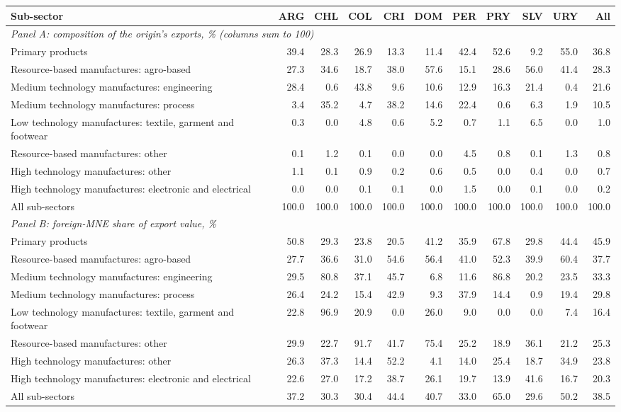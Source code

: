 \begin{tabular}{lrrrrrrrrrr}
\toprule
Sub-sector & ARG & CHL & COL & CRI & DOM & PER & PRY & SLV & URY & All \\
\midrule
\multicolumn{11}{l}{\textit{Panel A: composition of the origin's exports, \% (columns sum to 100)}} \\
Primary products & 39.4 & 28.3 & 26.9 & 13.3 & 11.4 & 42.4 & 52.6 & 9.2 & 55.0 & 36.8 \\
Resource-based manufactures: agro-based & 27.3 & 34.6 & 18.7 & 38.0 & 57.6 & 15.1 & 28.6 & 56.0 & 41.4 & 28.3 \\
Medium technology manufactures: engineering & 28.4 & 0.6 & 43.8 & 9.6 & 10.6 & 12.9 & 16.3 & 21.4 & 0.4 & 21.6 \\
Medium technology manufactures: process & 3.4 & 35.2 & 4.7 & 38.2 & 14.6 & 22.4 & 0.6 & 6.3 & 1.9 & 10.5 \\
Low technology manufactures: textile, garment and footwear & 0.3 & 0.0 & 4.8 & 0.6 & 5.2 & 0.7 & 1.1 & 6.5 & 0.0 & 1.0 \\
Resource-based manufactures: other & 0.1 & 1.2 & 0.1 & 0.0 & 0.0 & 4.5 & 0.8 & 0.1 & 1.3 & 0.8 \\
High technology manufactures: other & 1.1 & 0.1 & 0.9 & 0.2 & 0.6 & 0.5 & 0.0 & 0.4 & 0.0 & 0.7 \\
High technology manufactures: electronic and electrical & 0.0 & 0.0 & 0.1 & 0.1 & 0.0 & 1.5 & 0.0 & 0.1 & 0.0 & 0.2 \\
All sub-sectors & 100.0 & 100.0 & 100.0 & 100.0 & 100.0 & 100.0 & 100.0 & 100.0 & 100.0 & 100.0 \\
\midrule
\multicolumn{11}{l}{\textit{Panel B: foreign-MNE share of export value, \%}} \\
Primary products & 50.8 & 29.3 & 23.8 & 20.5 & 41.2 & 35.9 & 67.8 & 29.8 & 44.4 & 45.9 \\
Resource-based manufactures: agro-based & 27.7 & 36.6 & 31.0 & 54.6 & 56.4 & 41.0 & 52.3 & 39.9 & 60.4 & 37.7 \\
Medium technology manufactures: engineering & 29.5 & 80.8 & 37.1 & 45.7 & 6.8 & 11.6 & 86.8 & 20.2 & 23.5 & 33.3 \\
Medium technology manufactures: process & 26.4 & 24.2 & 15.4 & 42.9 & 9.3 & 37.9 & 14.4 & 0.9 & 19.4 & 29.8 \\
Low technology manufactures: textile, garment and footwear & 22.8 & 96.9 & 20.9 & 0.0 & 26.0 & 9.0 & 0.0 & 0.0 & 7.4 & 16.4 \\
Resource-based manufactures: other & 29.9 & 22.7 & 91.7 & 41.7 & 75.4 & 25.2 & 18.9 & 36.1 & 21.2 & 25.3 \\
High technology manufactures: other & 26.3 & 37.3 & 14.4 & 52.2 & 4.1 & 14.0 & 25.4 & 18.7 & 34.9 & 23.8 \\
High technology manufactures: electronic and electrical & 22.6 & 27.0 & 17.2 & 38.7 & 26.1 & 19.7 & 13.9 & 41.6 & 16.7 & 20.3 \\
All sub-sectors & 37.2 & 30.3 & 30.4 & 44.4 & 40.7 & 33.0 & 65.0 & 29.6 & 50.2 & 38.5 \\
\bottomrule
\end{tabular}

